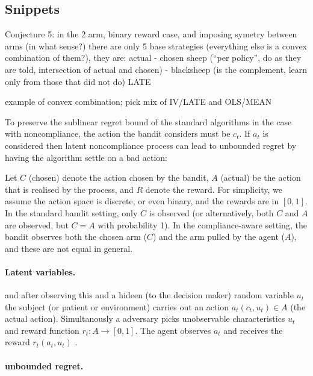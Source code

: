 \subsection{Snippets}


Conjecture 5: in the 2 arm, binary reward case, and imposing symetry between arms (in what sense?) there are only 5 base strategies (everything else is a convex combination of them?), they are:
actual - chosen
sheep (``per policy'', do as they are told, intersection of actual and chosen) - blacksheep (is the complement, learn only from those that did not do)
LATE

example of convex combination; pick mix of IV/LATE and OLS/MEAN 




To preserve the sublinear regret bound of the standard algorithms in the case with noncompliance, the action the bandit considers must be $c_t$. 
If $a_t$ is considered then latent noncompliance process can lead to unbounded regret by having the algorithm settle on a bad action:

Let $C$ (chosen) denote the action chosen by the bandit, 
$A$ (actual) be the action that is realised by the process, 
and $R$ denote the reward. For simplicity, we assume the action space is discrete, or even binary, and the rewards are in $[0,1]$. In the standard bandit setting, only $C$ is observed (or alternatively, both $C$ and $A$ are observed, but $C=A$ with probability 1). In the compliance-aware setting, the bandit observes both the chosen arm ($C$) and the arm pulled by the agent ($A$), and these are not equal in general. 


\paragraph{Latent variables.}
 and after observing this and a hideen (to the decision maker) random variable $u_t$ the subject
(or patient or environment) carries out an action $a_t(c_t,u_t)\in A$ (the actual action).
Simultanously a adversary picks unobservable characteristics $u_t$ and reward function $r_t : A → [0, 1]$. 
The agent observes $a_t$ and receives the reward $r_t(a_t,u_t)$ .

\paragraph{unbounded regret.}

